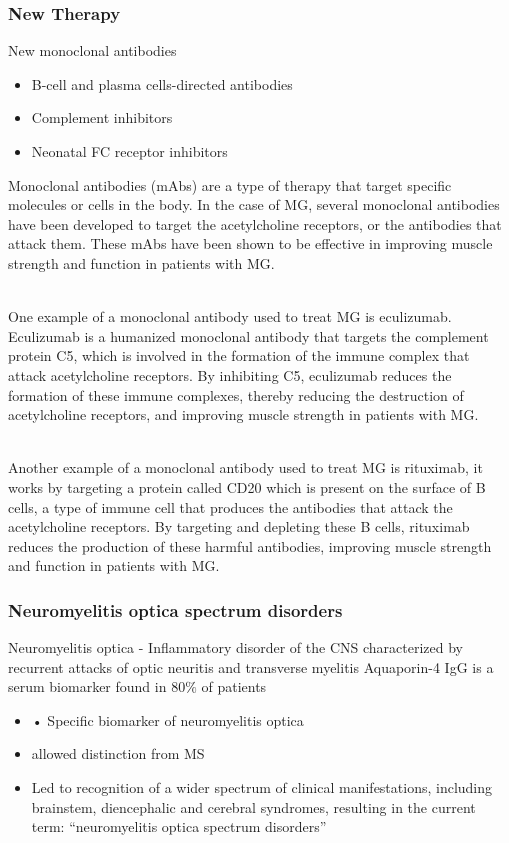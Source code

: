 \begin{itemize}
\begin{itemize}
\subsubsection{New Therapy}
New monoclonal antibodies
\begin{itemize}
    \item B-cell and plasma cells-directed antibodies
    \item Complement inhibitors
    \item Neonatal FC receptor inhibitors
\end{itemize}
Monoclonal antibodies (mAbs) are a type of therapy that target specific molecules or cells in the body. In the case of MG, several monoclonal antibodies have been developed to target the acetylcholine receptors, or the antibodies that attack them. These mAbs have been shown to be effective in improving muscle strength and function in patients with MG.

\\One example of a monoclonal antibody used to treat MG is eculizumab. Eculizumab is a humanized monoclonal antibody that targets the complement protein C5, which is involved in the formation of the immune complex that attack acetylcholine receptors. By inhibiting C5, eculizumab reduces the formation of these immune complexes, thereby reducing the destruction of acetylcholine receptors, and improving muscle strength in patients with MG.

\\Another example of a monoclonal antibody used to treat MG is rituximab, it works by targeting a protein called CD20 which is present on the surface of B cells, a type of immune cell that produces the antibodies that attack the acetylcholine receptors. By targeting and depleting these B cells, rituximab reduces the production of these harmful antibodies, improving muscle strength and function in patients with MG.
\subsubsection{Neuromyelitis optica spectrum disorders}
Neuromyelitis optica - Inflammatory disorder of the CNS characterized by
recurrent attacks of optic neuritis and transverse myelitis
Aquaporin-4 IgG is a serum biomarker found in 80$\%$ of patients
\begin{itemize}
    \item • Specific biomarker of neuromyelitis optica
\item allowed distinction from MS
\item Led to recognition of a wider spectrum of clinical manifestations,
including brainstem, diencephalic and cerebral syndromes,
resulting in the current term:
“neuromyelitis optica spectrum disorders”
\end{itemize}


\end{itemize}
\end{itemize}
